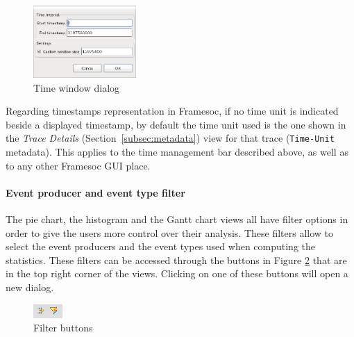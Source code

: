 \documentclass[twoside]{article}
\begin{document}
\begin{sloppypar}
\begin{figure}[h!]
  \centering
    \includegraphics[width=0.35\textwidth]{images/window_dialog.png}
  \caption{Time window dialog}
  \label{fig:window_dialog}
\end{figure}

Regarding timestamps representation in Framesoc, if no time unit is indicated beside a displayed timestamp, 
by default the time unit used is the one shown in the \emph{Trace Details} (Section~\ref{subsec:metadata}) view for that trace (\texttt{Time-Unit} metadata). 
This applies to the time management bar described above, as well as to any other Framesoc GUI place.

\paragraph{Event producer and event type filter}
The pie chart, the histogram and the Gantt chart views all have filter options in order to give the users more control over their analysis. These filters allow to select the event producers and the event types used when computing the statistics. These filters can be accessed through the buttons in Figure \ref{fig:filterButtons} that are in the top right corner of the views. Clicking on one of these buttons will open a new dialog. 

\begin{figure}[h!]
	\centering
		\includegraphics[width=0.1\textwidth]{images/filterButtons.png}
	\caption{Filter buttons}
	\label{fig:filterButtons}
\end{figure}


\end{sloppypar}
\end{document}
